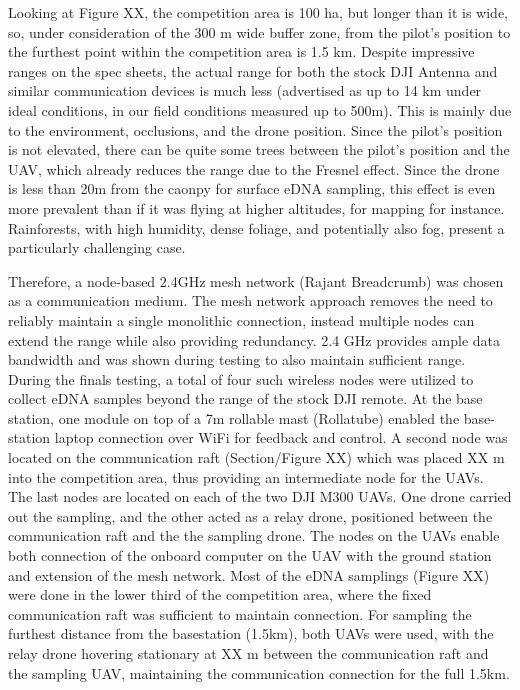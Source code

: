 Looking at Figure XX, the competition area is 100 ha, but longer than it is wide, so, under consideration of the 300 m wide buffer zone, from the pilot's position to the furthest point within the competition area is 1.5 km. Despite impressive ranges on the spec sheets, the actual range for both the stock DJI Antenna and similar communication devices is much less (advertised as up to 14 km under ideal conditions, in our field conditions measured up to 500m). This is mainly due to the environment, occlusions, and the drone position. Since the pilot's position is not elevated, there can be quite some trees between the pilot's position and the UAV, which already reduces the range due to the Fresnel effect. Since the drone is less than 20m from the caonpy for surface eDNA sampling, this effect is even more prevalent than if it was flying at higher altitudes, for mapping for instance. Rainforests, with high humidity, dense foliage, and potentially also fog, present a particularly challenging case.

Therefore, a node-based 2.4GHz mesh network (Rajant Breadcrumb) was chosen as a communication medium. The mesh network approach removes the need to reliably maintain a single monolithic connection, instead multiple nodes can extend the range while also providing redundancy. 2.4 GHz provides ample data bandwidth and was shown during testing to also maintain sufficient range. 
During the finals testing, a total of four such wireless nodes were utilized to collect eDNA samples beyond the range of the stock DJI remote. At the base station, one module on top of a 7m rollable mast (Rollatube) enabled the base-station laptop connection over WiFi for feedback and control. A second node was located on the communication raft (Section/Figure XX) which was placed XX m into the competition area, thus providing an intermediate node for the UAVs. The last nodes are located on each of the two DJI M300 UAVs. One drone carried out the sampling, and the other acted as a relay drone, positioned between the communication raft and the the sampling drone. The nodes on the UAVs enable both connection of the onboard computer on the UAV with the ground station and extension of the mesh network. Most of the eDNA samplings (Figure XX) were done in the lower third of the competition area, where the fixed communication raft was sufficient to maintain connection. For sampling the furthest distance from the basestation (1.5km), both UAVs were used, with the relay drone hovering stationary at XX m between the communication raft and the sampling UAV, maintaining the communication connection for the full 1.5km. 

